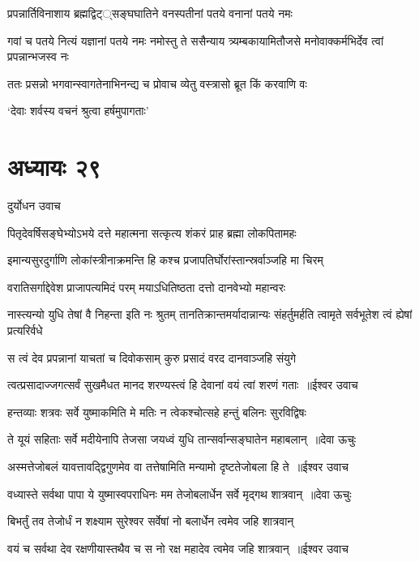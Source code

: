 \twolineshloka
{प्रपन्नार्तिविनाशाय ब्रह्मद्विट््सङ्घघातिने}
{वनस्पतीनां पतये वनानां पतये नमः}


\threelineshloka
{गवां च पतये नित्यं यज्ञानां पतये नमः}
{नमोस्तु ते ससैन्याय त्र्यम्बकायामितौजसे}
{मनोवाक्कर्मभिर्देव त्वां प्रपन्नान्भजस्व नः}


\twolineshloka
{ततः प्रसन्नो भगवान्स्वागतेनाभिनन्द्य च}
{प्रोवाच व्येतु वस्त्रासो ब्रूत किं करवाणि वः}


`देवाः शर्वस्य वचनं श्रुत्वा हर्षमुपागताः'
\chapter{अध्यायः २९}
\twolineshloka
{दुर्योधन उवाच}
{}


\twolineshloka
{पितृदेवर्षिसङ्घेभ्योऽभये दत्ते महात्मना}
{सत्कृत्य शंकरं प्राह ब्रह्मा लोकपितामहः}


\twolineshloka
{इमान्यसुरदुर्गाणि लोकांस्त्रीनाक्रमन्ति हि}
{कश्च प्रजापतिर्घोरांस्तान्स्रर्वाञ्जहि मा चिरम्}


\twolineshloka
{वरातिसर्गाद्देवेश प्राजापत्यमिदं परम्}
{मयाऽधितिष्ठता दत्तो दानवेभ्यो महान्वरः}


\threelineshloka
{नास्त्यन्यो युधि तेषां वै निहन्ता इति नः श्रुतम्}
{तानतिक्रान्तमर्यादान्नान्यः संहर्तुमर्हति}
{त्वामृते सर्वभूतेश त्वं ह्येषां प्रत्यरिर्वधे}


\twolineshloka
{स त्वं देव प्रपन्नानां याचतां च दिवोकसाम्}
{कुरु प्रसादं वरद दानवाञ्जहि संयुगे}


\threelineshloka
{त्वत्प्रसादाज्जगत्सर्वं सुखमैधत मानद}
{शरण्यस्त्वं हि देवानां वयं त्वां शरणं गताः ॥ईश्वर उवाच}
{}


\twolineshloka
{हन्तव्याः शत्रवः सर्वे युष्माकमिति मे मतिः}
{न त्वेकश्चोत्सहे हन्तुं बलिनः सुरविद्विषः}


\threelineshloka
{ते यूयं सहिताः सर्वे मदीयेनापि तेजसा}
{जयध्वं युधि तान्सर्वान्सङ्घातेन महाबलान् ॥देवा ऊचुः}
{}


\threelineshloka
{अस्मत्तेजोबलं यावत्तावद्द्विगुणमेव वा}
{तत्तेषामिति मन्यामो दृष्टतेजोबला हि ते ॥ईश्वर उवाच}
{}


\threelineshloka
{वध्यास्ते सर्वथा पापा ये युष्मास्वपराधिनः}
{मम तेजोबलार्धेन सर्वे मृद्गथ शात्रवान् ॥देवा ऊचुः}
{}


\twolineshloka
{बिभर्तुं तव तेजोर्धं न शक्ष्याम सुरेश्वर}
{सर्वेषां नो बलार्धेन त्वमेव जहि शात्रवान्}


\threelineshloka
{वयं च सर्वथा देव रक्षणीयास्तथैव च}
{स नो रक्ष महादेव त्वमेव जहि शात्रवान् ॥ईश्वर उवाच}
{}


